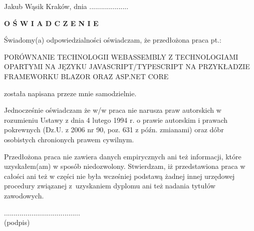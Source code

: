 \documentclass[12pt,a4paper,oneside]{book}
\begin{document}
\newpage\thispagestyle{empty}
Jakub Wąsik \hfill Kraków, dnia ....................\par\vspace{1cm}\par
\centerline{{\Large \bf O Ś W I A D C Z E N I E}}
\par\vspace{1.4cm}\par
Świadomy(a) odpowiedzialności oświadczam, że przedłożona praca pt.:
\begin{center}
{\sc PORÓWNANIE TECHNOLOGII WEBASSEMBLY Z TECHNOLOGIAMI OPARTYMI NA
JĘZYKU JAVASCRIPT/TYPESCRIPT NA PRZYKŁADZIE FRAMEWORKU BLAZOR ORAZ
ASP.NET CORE}
\end{center}
została napisana przeze mnie samodzielnie.
\par
Jednocześnie oświadczam że w/w praca nie narusza praw autorskich w rozumieniu Ustawy z dnia 4 lutego 1994 r. o prawie autorskim i prawach pokrewnych (Dz.U. z 2006 nr 90, poz.
631 z późn. zmianami) oraz dóbr osobistych chronionych prawem cywilnym.
\par
Przedłożona praca nie zawiera danych empirycznych ani też informacji, które uzyskałem(am) w sposób niedozwolony. Stwierdzam, iż przedstawiona praca w całości ani też w części nie była wcześniej podstawą żadnej innej urzędowej procedury związanej z~uzyskaniem dyplomu ani też nadania tytułów zawodowych.
\par\vspace{1cm}\par
\begin{flushright}
....................................... \ \ \ \ \ \ \\
{\scriptsize (podpis)\hspace{2.3cm}\ }
\end{flushright}
\end{document}
